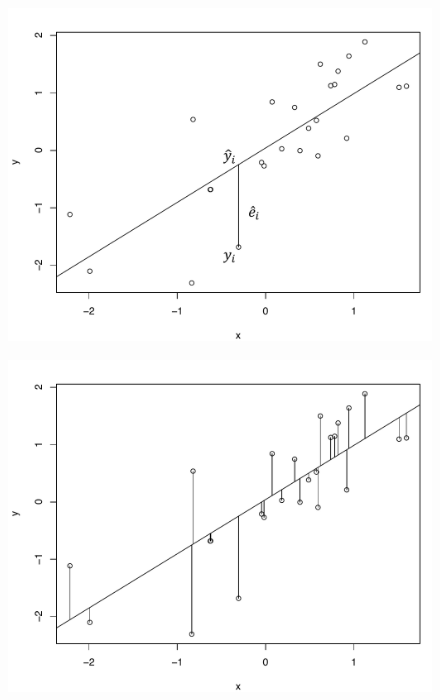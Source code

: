 \documentclass[11pt, fleqn]{beamer}\usepackage[]{graphicx}\usepackage[]{color}
\begin{document}
\begin{frame}
\begin{figure}
\includegraphics[scale=0.5]{figure/scatter3_2.pdf}
\end{figure}
\end{frame}

\begin{frame}
\begin{figure}
\includegraphics[scale=0.5]{figure/scatter4_2.pdf}
\end{figure}
\end{frame}
\end{document}
